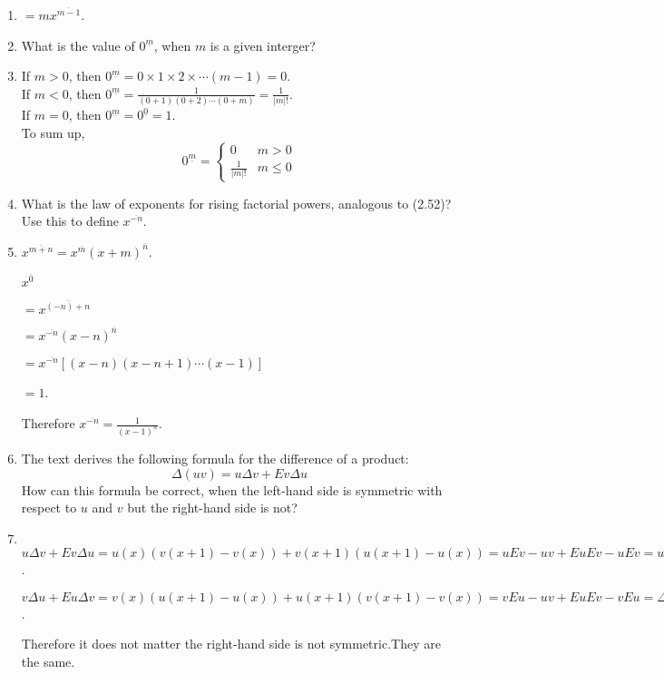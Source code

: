 \documentclass[12pt,a4paper]{article}
\makeatletter
\newtheorem*{solution}{Solution}
\theoremstyle{definition}
\renewenvironment{solution}[1][Solution] {\par\pushQED{\qed}\normalfont\topsep6\p@\@plus6\p@\relax\trivlist\item[\hskip\labelsep\bfseries#1\@addpunct{.}]\ignorespaces}{\popQED\endtrivlist\@endpefalse} \makeatother
\makeatother
\begin{document}
\begin{enumerate}
\begin{solution}
        	$=mx^{\overline{m-1}}$.
        \end{solution}
    \item 
        What is the value of $0^{\underline{m}}$, when $m$ is a given interger?
        \begin{solution}
        	If $m>0$, then $0^{\underline{m}}=0\times1\times2\times\cdots(m-1)=0$.\\
        	If $m<0$, then $0^{\underline{m}}=\frac{1}{(0+1)(0+2)\cdots(0+m)}=\frac{1}{|m|!}$.\\
        	If $m=0$, then $0^{\underline{m}}=0^{\underline{0}}=1$.\\
        	To sum up,
        	\begin{equation*}
        	    0^{\underline{m}}=
        	        \begin{cases}
        	            0&m> 0\\
        	            \frac{1}{|m|!}&m\le 0
        	        \end{cases}
        	\end{equation*}
        	
        \end{solution}
    \item 
        What is the law of exponents for rising factorial powers, analogous to (2.52)?Use this to define $x^{\overline{-n}}$.
        \begin{solution}
        	$x^{\overline{m+n}}=x^{\overline{m}}(x+m)^{\overline{n}}$.
        	
        	\quad$x^{\overline{0}}$
        	
        	$=x^{\overline{(-n)+n}}$
        	
        	$=x^{\overline{-n}} (x-n)^{\overline{n}}$
        	
        	$=x^{\overline{-n}}[(x-n)(x-n+1)\cdots(x-1)]$
        	
        	$=1$.
        	
        	Therefore $x^{\overline{-n}}=\frac{1}{(x-1)^{\underline{n}}}$.
        \end{solution}
    \item 
        The text derives the following formula for the difference of a product:
        \begin{equation*}
            \Delta(uv)=u\Delta v+Ev\Delta u
        \end{equation*}
        How can this formula be correct, when the left-hand side is symmetric with respect to $u$ and $v$ but the right-hand side is not?
        \begin{solution}
        	\quad\\
        	$u\Delta v+Ev\Delta u=u(x)(v(x+1)-v(x))+v(x+1)(u(x+1)-u(x))=uEv-uv+EuEv-uEv=u(x+1)v(x+1)-u(x)v(x)=\Delta(uv)$.
        	
        	$v\Delta u+Eu\Delta v=v(x)(u(x+1)-u(x))+u(x+1)(v(x+1)-v(x))=vEu-uv+EuEv-vEu=\Delta(uv) $.
        	
        	Therefore it does not matter the right-hand side is not symmetric.They are the same.
        \end{solution}
        
\end{enumerate}

\end{document}

